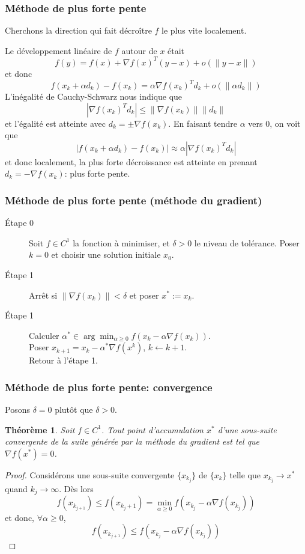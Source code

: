 \documentclass[usepdftitle=false]{beamer}
\newtheorem{thm}{Théorème}
\def\red{\color{red}}
\begin{document}
\begin{frame}
\frametitle{Méthode de plus forte pente}

Cherchons la direction qui fait décroître $f$ le plus vite localement.

\mbox{}

Le développement linéaire de $f$ autour de $x$ était
$$
f(y) = f(x) + \nabla f(x)^T(y-x) + o(\| y-x \|)
$$
et donc
$$
f(x_k + \alpha d_k) - f(x_k) = \alpha \nabla f(x_k)^T d_k + o(\| \alpha d_k \| )
$$
L'inégalité de Cauchy-Schwarz nous indique que
$$
| \nabla f(x_k)^T d_k | \leq \| \nabla f(x_k) \| \| d_k \|
$$
et l'égalité est atteinte avec $d_k = \pm \nabla f(x_k)$. En faisant tendre $\alpha$ vers 0, on voit que
$$
| f(x_k + \alpha d_k) - f(x_k) | \approx \alpha | \nabla f(x_k)^T d_k |
$$
et donc localement, la plus forte décroissance est atteinte en prenant $d_k = -\nabla f(x_k)$: {\red plus forte pente}.

\end{frame}

\begin{frame}
\frametitle{Méthode de plus forte pente (méthode du gradient)}
	
\begin{description}
\item[Étape 0]
Soit $f \in C^1$ la fonction à minimiser, et $\delta > 0$ le niveau de tolérance.
Poser $k = 0$ et choisir une solution initiale $x_0$.
\item[Étape 1]
Arrêt si $\| \nabla f(x_k) \| < \delta$ et poser $x^* := x_{k}$.
\item[Étape 1]
Calculer $\alpha^* \in \arg\min_{\alpha \geq 0} f(x_k - \alpha \nabla f(x_k))$.\\
Poser $x_{k+1} = x_k - \alpha^* \nabla f(x^k)$, $k \leftarrow k+1$.\\
Retour à l'étape 1.
\end{description}

\end{frame}

\begin{frame}
\frametitle{Méthode de plus forte pente: convergence}

Posons $\delta = 0$ plutôt que $\delta > 0$.

\begin{thm}
Soit $f \in C^1$.
Tout point d'accumulation $x^*$ d'une sous-suite convergente de la suite générée par la méthode
du gradient est tel que $\nabla f(x^*) = 0$.
\end{thm}

\begin{proof}
Considérons une sous-suite convergente $\{ x_{k_j} \}$ de $\{ x_k \}$ telle que $x_{k_j} \rightarrow x^*$ quand $k_j \rightarrow \infty$. Dès lors
$$
f(x_{k_{j+1}}) \leq f(x_{k_j+1}) = \min_{\alpha \geq 0} f(x_{k_j} - \alpha \nabla f(x_{k_j}))
$$
et donc, $\forall \alpha \geq 0$,
$$
f(x_{k_{j+1}}) \leq f(x_{k_j} - \alpha \nabla f(x_{k_j}))
$$
\end{proof}

\end{frame}
\end{document}
